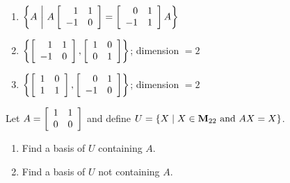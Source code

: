 \begin{multicols}{2}
\begin{ex}
\begin{enumerate}[label={\alph*.}]
\item $\left\{
A\ \middle|\ A
\left[ \begin{array}{rr}
1 & 1 \\
-1 & 0
\end{array} \right]
=
\left[ \begin{array}{rr}
0 & 1 \\
-1 & 1
\end{array} \right] A
\right\}$

\end{enumerate}
\begin{sol}
\begin{enumerate}[label={\alph*.}]
\setcounter{enumi}{1}
\item $\left\{
\left[ \begin{array}{rr}
1 & 1 \\
-1 & 0
\end{array} \right]
, 
\left[ \begin{array}{rr}
1 & 0 \\
0 & 1
\end{array} \right]
\right\}$; dimension $= 2$

\setcounter{enumi}{3}
\item $\left\{
\left[ \begin{array}{rr}
1 & 0 \\
1 & 1
\end{array} \right]
, 
\left[ \begin{array}{rr}
0 & 1 \\
-1 & 0
\end{array} \right]
\right\}$; dimension $= 2$

\end{enumerate}
\end{sol}
\end{ex}

\begin{ex}
Let $A = 
\left[ \begin{array}{rr}
1 & 1 \\
0 & 0
\end{array} \right]$ and define
\newline $U = \{X \mid X \in \textbf{M}_{22} \mbox{ and } AX = X\}$.

\begin{enumerate}[label={\alph*.}]
\item Find a basis of $U$ containing $A$.

\item Find a basis of $U$ not containing $A$.


\end{enumerate}
\end{ex}
\end{multicols}
